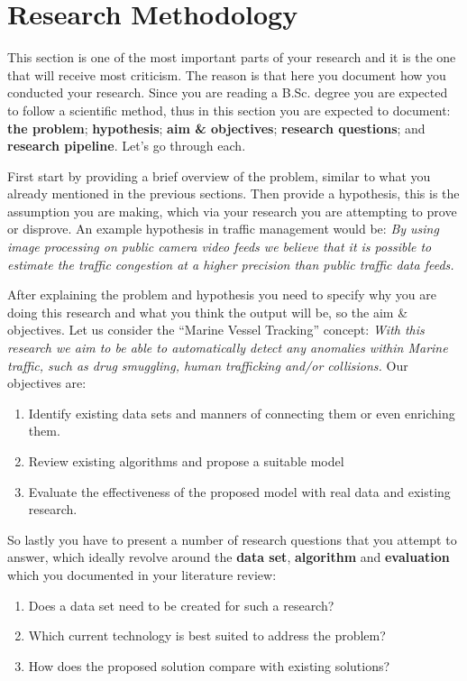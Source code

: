 \section{Research Methodology}
\label{sec:Res}
\par This section is one of the most important parts of your research and it is the one that will receive most criticism. The reason is that here you document how you conducted your research. Since you are reading a B.Sc. degree you are expected to follow a scientific method, thus in this section you are expected to document: \textbf{the problem}; \textbf{hypothesis}; \textbf{aim \& objectives}; \textbf{research questions}; and \textbf{research pipeline}. Let's go through each.

\par First start by providing a brief overview of the problem, similar to what you already mentioned in the previous sections. Then provide a hypothesis, this is the assumption you are making, which via your research you are attempting to prove or disprove. An example hypothesis in traffic management would be: \textit{By using image processing on public camera video feeds we believe that it is possible to estimate the traffic congestion at a higher precision than public traffic data feeds.}

\par After explaining the problem and hypothesis you need to specify why you are doing this research and what you think the output will be, so the aim \& objectives. Let us consider the \enquote{Marine Vessel Tracking} concept: \textit{With this research we aim to be able to automatically detect any anomalies within Marine traffic, such as drug smuggling, human trafficking and/or collisions.} Our objectives are:
\begin{enumerate}
    \item Identify existing data sets and manners of connecting them or even enriching them.
    \item Review existing algorithms and propose a suitable model
    \item Evaluate the effectiveness of the proposed model with real data and existing research.
\end{enumerate}

\par So lastly you have to present a number of research questions that you attempt to answer, which ideally revolve around the \textbf{data set}, \textbf{algorithm} and \textbf{evaluation} which you documented in your literature review:
\begin{enumerate}
    \item Does a data set need to be created for such a research?
    \item Which current technology is best suited to address the problem?
    \item How does the proposed solution compare with existing solutions?
\end{enumerate}

